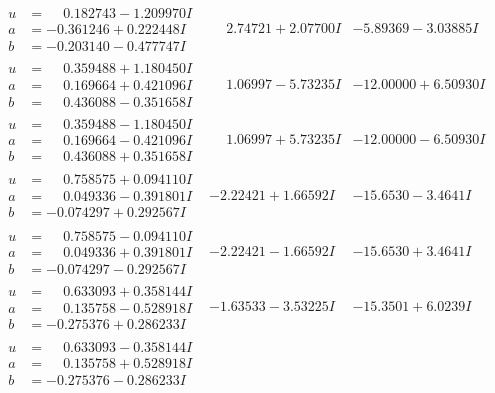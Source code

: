 \documentclass[1p]{elsarticle_modified}
\theoremstyle{definition}
\begin{document}
$$\begin{array}{c|c|c}
\begin{aligned}
u &= \phantom{-}0.182743 - 1.209970 I \\
a &= -0.361246 + 0.222448 I \\
b &= -0.203140 - 0.477747 I\end{aligned}
 & \phantom{-}2.74721 + 2.07700 I & -5.89369 - 3.03885 I \\ \hline\begin{aligned}
u &= \phantom{-}0.359488 + 1.180450 I \\
a &= \phantom{-}0.169664 + 0.421096 I \\
b &= \phantom{-}0.436088 - 0.351658 I\end{aligned}
 & \phantom{-}1.06997 - 5.73235 I & -12.00000 + 6.50930 I \\ \hline\begin{aligned}
u &= \phantom{-}0.359488 - 1.180450 I \\
a &= \phantom{-}0.169664 - 0.421096 I \\
b &= \phantom{-}0.436088 + 0.351658 I\end{aligned}
 & \phantom{-}1.06997 + 5.73235 I & -12.00000 - 6.50930 I \\ \hline\begin{aligned}
u &= \phantom{-}0.758575 + 0.094110 I \\
a &= \phantom{-}0.049336 - 0.391801 I \\
b &= -0.074297 + 0.292567 I\end{aligned}
 & -2.22421 + 1.66592 I & -15.6530 - 3.4641 I \\ \hline\begin{aligned}
u &= \phantom{-}0.758575 - 0.094110 I \\
a &= \phantom{-}0.049336 + 0.391801 I \\
b &= -0.074297 - 0.292567 I\end{aligned}
 & -2.22421 - 1.66592 I & -15.6530 + 3.4641 I \\ \hline\begin{aligned}
u &= \phantom{-}0.633093 + 0.358144 I \\
a &= \phantom{-}0.135758 - 0.528918 I \\
b &= -0.275376 + 0.286233 I\end{aligned}
 & -1.63533 - 3.53225 I & -15.3501 + 6.0239 I \\ \hline\begin{aligned}
u &= \phantom{-}0.633093 - 0.358144 I \\
a &= \phantom{-}0.135758 + 0.528918 I \\
b &= -0.275376 - 0.286233 I\end{aligned}

\end{array}$$
\end{document}
